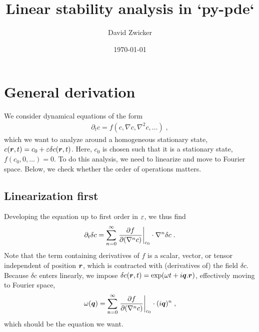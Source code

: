 \documentclass[
	superscriptaddress,
	twocolumn,
	aps, pre
]{revtex4-1}
\renewcommand{\vr}{\vect r}
\newcommand{\vq}{\vect q}
\newcommand{\dc}{\delta c}
\begin{document}
\title{Linear stability analysis in `py-pde`}
\author{David Zwicker}
\date{\today}

\begin{abstract}
\end{abstract}


\maketitle
\tableofcontents


\section{General derivation}
We consider dynamical equations of the form
\begin{align}
	\partial_t c = f(c, \nabla c, \nabla^2 c, \ldots)
	\;,
\end{align}
which we want to analyze around a homogeneous stationary state, $c(\vr, t) = c_0 + \eps\dc(\vr, t)$.
Here, $c_0$ is chosen such that it is a stationary state, $f(c_0, 0, \ldots)=0$.
To do this analysis, we need to linearize and move to Fourier space.
Below, we check whether the order of operations matters.

\subsection{Linearization first}
Developing the equation up to first order in $\varepsilon$, we thus find
\begin{align}
	\partial_t \dc = \sum_{n=0}^\infty \takenat{\pfrac{f}{(\nabla^n c)}}{c_0} \cdot \nabla^n \dc
	\;.
\end{align}
Note that the term containing derivatives of $f$ is a scalar, vector, or tensor independent of position $\vr$, which is contracted with (derivatives of) the field $\dc$.
Because $\dc$ enters linearly, we impose $\dc(\vr, t) = \exp(\omega t + i \vq.\vr)$, effectively moving to Fourier space,
\begin{align}
	\label{eqn:growth_rate_goal}
	\omega(\vq) = \sum_{n=0}^\infty \takenat{\pfrac{f}{(\nabla^n c)}}{c_0}\cdot (i\vect q)^n
	\;,
\end{align}
which should be the equation we want.
\end{document}
